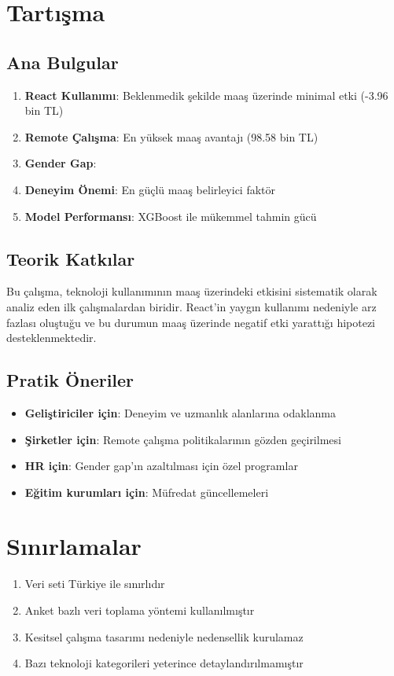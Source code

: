 \documentclass[12pt,a4paper]{article}
\begin{document}
\section{Tartışma}

\subsection{Ana Bulgular}
\begin{enumerate}
    \item \textbf{React Kullanımı}: Beklenmedik şekilde maaş üzerinde minimal etki (-3.96 bin TL)
    \item \textbf{Remote Çalışma}: En yüksek maaş avantajı (98.58 bin TL)
    \item \textbf{Gender Gap}: %
    \item \textbf{Deneyim Önemi}: En güçlü maaş belirleyici faktör
    \item \textbf{Model Performansı}: XGBoost ile mükemmel tahmin gücü
\end{enumerate}

\subsection{Teorik Katkılar}
Bu çalışma, teknoloji kullanımının maaş üzerindeki etkisini sistematik olarak analiz eden ilk çalışmalardan biridir. React'in yaygın kullanımı nedeniyle arz fazlası oluştuğu ve bu durumun maaş üzerinde negatif etki yarattığı hipotezi desteklenmektedir.

\subsection{Pratik Öneriler}
\begin{itemize}
    \item \textbf{Geliştiriciler için}: Deneyim ve uzmanlık alanlarına odaklanma
    \item \textbf{Şirketler için}: Remote çalışma politikalarının gözden geçirilmesi
    \item \textbf{HR için}: Gender gap'ın azaltılması için özel programlar
    \item \textbf{Eğitim kurumları için}: Müfredat güncellemeleri
\end{itemize}

\section{Sınırlamalar}
\begin{enumerate}
    \item Veri seti Türkiye ile sınırlıdır
    \item Anket bazlı veri toplama yöntemi kullanılmıştır
    \item Kesitsel çalışma tasarımı nedeniyle nedensellik kurulamaz
    \item Bazı teknoloji kategorileri yeterince detaylandırılmamıştır
\end{enumerate}
\end{document}
